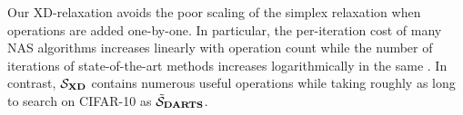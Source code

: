 Our XD-relaxation avoids the poor scaling of the simplex relaxation when operations are added one-by-one.
In particular, the per-iteration cost of many NAS algorithms increases linearly with operation count \citep{liu2019darts} while the number of iterations of state-of-the-art methods increases logarithmically in the same \citep{li2021gaea}.
In contrast, $\mathcal S_{\mathbf{XD}}$ contains numerous useful operations while taking roughly as long to search on CIFAR-10 as $\tilde{\mathcal S}_{\mathbf{DARTS}}$.


%
%
%
%

